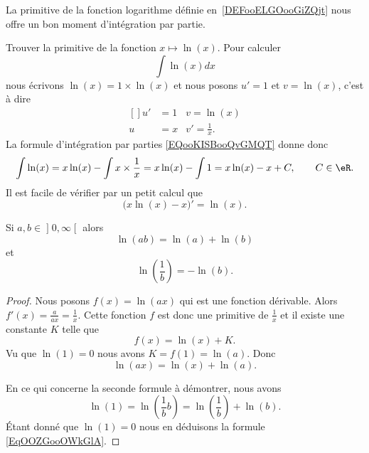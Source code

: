 \begin{example}\label{primln}
    La primitive de la fonction logarithme définie en~\ref{DEFooELGOooGiZQjt} nous offre un bon moment d'intégration par partie.

    Trouver la primitive de la fonction \( x\mapsto \ln(x)\). Pour calculer
    \begin{equation}
        \int\ln(x)dx
    \end{equation}
    nous écrivons \( \ln(x)=1\times \ln(x)\) et nous posons \( u'=1\) et \( v=\ln(x)\), c'est à dire
    \begin{equation}
        \begin{aligned}[]
            u'&=1&v=\ln(x)\\
            u&=x&v'=\frac{1}{ x }.
        \end{aligned}
    \end{equation}
    La formule d'intégration par parties \eqref{EQooKISBooQvGMQT} donne donc
    \begin{equation}
        \int \ln(x)=x\ln(x)-\int x\times \frac{1}{ x }=x\ln(x)-\int 1=x\ln(x)-x+C, \qquad C\in\eR.
    \end{equation}
    Il est facile de vérifier par un petit calcul que
    \begin{equation}
        \big( x\ln(x)-x \big)'=\ln(x).
    \end{equation}
\end{example}

\begin{lemma}   \label{LemPEYJooEZlueU}
Si \( a,b\in\mathopen] 0 , \infty \mathclose[\) alors
    \begin{equation}
        \ln(ab)=\ln(a)+\ln(b)
    \end{equation}
    et
    \begin{equation}    \label{EqOOZGooOWkGlA}
        \ln\left( \frac{1}{ b } \right)=-\ln(b).
    \end{equation}
\end{lemma}

\begin{proof}
    Nous posons \( f(x)=\ln(ax)\) qui est une fonction dérivable. Alors \( f'(x)=\frac{ a }{ ax }=\frac{1}{ x }\). Cette fonction \( f\) est donc une primitive de \( \frac{1}{ x }\) et il existe une constante \( K\) telle que
    \begin{equation}
        f(x)=\ln(x)+K.
    \end{equation}
    Vu que \( \ln(1)=0\) nous avons \( K=f(1)= \ln(a)\). Donc
    \begin{equation}
        \ln(ax)=\ln(x)+\ln(a).
    \end{equation}

    En ce qui concerne la seconde formule à démontrer, nous avons
    \begin{equation}
        \ln(1)=\ln\left( \frac{1}{ b }b \right)=\ln\left( \frac{1}{ b } \right)+\ln(b).
    \end{equation}
    Étant donné que $\ln(1)=0$ nous en déduisons la formule \eqref{EqOOZGooOWkGlA}.
\end{proof}

